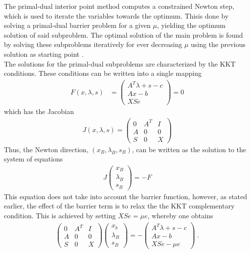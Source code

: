 The primal-dual interior point method computes a constrained Newton step, which is used to iterate the variables towards the optimum. Thisis done by solving a primal-dual barrier problem for a given $\mu$, yielding the optimum solution of said subproblem. The optimal solution of the main problem is found by solving these subproblems iteratively for ever decreasing $\mu$ using the previous solution as starting point \cite{ipopt}.\\
The solutions for the primal-dual subproblems are characterized by the KKT conditions. These conditions can be written into a single mapping
 \begin{align}
    F(x , \lambda, s) &= \begin{pmatrix}
           A^T \lambda + s - c \\
           A x - b \\
           X S e
         \end{pmatrix} = 0
  \end{align}
  which has the Jacobian
 \begin{align}
    J(x , \lambda, s) = \begin{pmatrix}
           0 & A^T & I	\\
           A & 0 & 0 	\\
           S & 0 & X
         \end{pmatrix}
  \end{align}
Thus, the Newton direction, $(x_B , \lambda_B , s_B)$, can be written as the solution to the system of equations
\begin{align}
J \begin{pmatrix}
           x_B \\
           \lambda_B \\
           s_B
         \end{pmatrix} = -F
\end{align}
This equation does not take into account the barrier function, however, as stated earlier, the effect of the barrier term is to relax the the KKT complementary condition. This is achieved by setting $X S e = \mu e$, whereby one obtains
\begin{align}
	\begin{pmatrix}
    	 0 & A^T & I    \\
         A & 0 & 0 		\\
         S & 0 & X
    \end{pmatrix} 
    \begin{pmatrix}
    	x_b 		    \\
        \lambda_B		\\
        s_B
    \end{pmatrix} =
    - \begin{pmatrix}
    	  A^T \lambda + s - c 	\\
          A x - b 				\\
          X S e - \mu e
    \end{pmatrix} \; . \label{eq:newtondirection}
\end{align}
